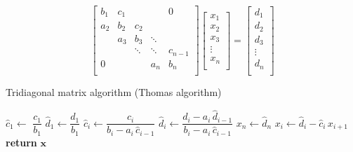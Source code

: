   \begin{equation}
    \begin{bmatrix}{b_{1}}&{c_{1}}&{}&{}&{0}\\
      {a_{2}}&{b_{2}}&{c_{2}}&{}&{}\\
      {}&{a_{3}}&{b_{3}}&\ddots &{}\\
      {}&{}&\ddots &\ddots &{c_{n-1}}\\
      {0}&{}&{}&{a_{n}}&{b_{n}}\\
      \end{bmatrix}
      \begin{bmatrix}{x_{1}}\\
      {x_{2}}\\{x_{3}}\\\vdots \\
      {x_{n}}\\
      \end{bmatrix}
      =
      \begin{bmatrix}{d_{1}}\\
      {d_{2}}\\{d_{3}}\\
      \vdots \\{d_{n}}\\
    \end{bmatrix}
  \end{equation}

\begin{algorithm}\caption{Tridiagonal matrix algorithm (Thomas algorithm)}\label{TDMA}
  \setlength{\lineskip}{7pt}
  \begin{algorithmic}[1]
      \State $\hat c_1 \gets$ $ \dfrac{c_1}{b_1}$
      \State $\hat d_1 \gets \dfrac{d_1}{b_1}$
        \State $\hat c_i \gets \dfrac{c_i}{b_i-a_i \, \hat c_{i-1}}$
        \State $\hat d_i \gets \dfrac{d_i - a_i \, \hat d_{i-1}}{b_i-a_i \, \hat c_{i-1}}$
      \EndFor
      \State $x_n \gets \hat d_n$
        \State $x_i \gets \hat d_i - \hat c_i \, x_{i+1}$
      \EndFor
      \State \textbf{return} $\textbf{x}$
    \EndFunction
  \end{algorithmic}
\end{algorithm}


